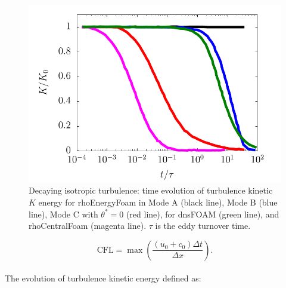 \documentclass[a5paper]{sapthesis}
\begin{document}
	\begin{figure}
		\centering
		\includegraphics[width=0.8\linewidth]{Figures/TKE_DIT}
		\caption{Decaying isotropic turbulence: time evolution of turbulence kinetic $K$ energy for rhoEnergyFoam in Mode A (black line), Mode B (blue line), Mode C with $\theta^* = 0$ (red line), for dnsFOAM (green line), and rhoCentralFoam (magenta line). $\tau$ is the eddy turnover time.}
		\label{DIT}
	\end{figure} 
	
	\begin{equation}
		\text{CFL} = \max \left( \frac{(u_0 + c_0) \Delta t}{\Delta x} \right).
	\end{equation}
	\\
	The evolution of turbulence kinetic energy defined as:
	
\end{document}
